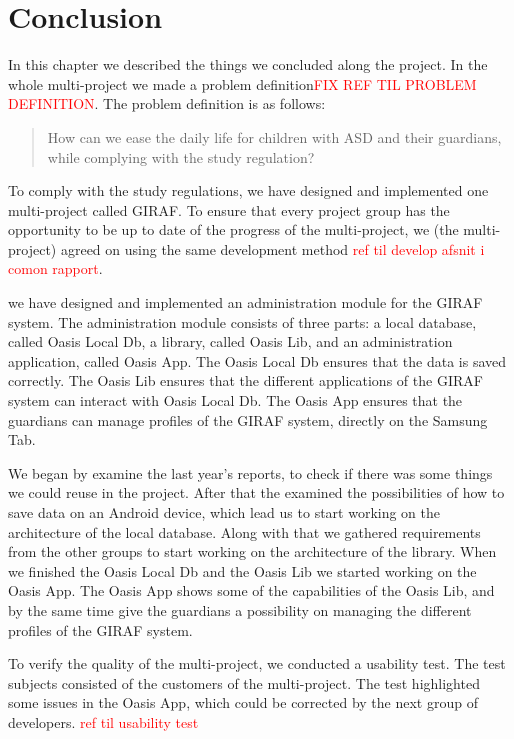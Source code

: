 \section{Conclusion}
In this chapter we described the things we concluded along the project. In the whole multi-project we made a problem definition\textcolor{red}{FIX REF TIL PROBLEM DEFINITION}. The problem definition is as follows:

\begin{quotation}
How can we ease the daily life for children with ASD and their guardians, while complying with the study regulation? 
\end{quotation}

To comply with the study regulations, we have designed and implemented one multi-project called GIRAF. To ensure that every project group has the opportunity to be up to date of the progress of the multi-project, we (the multi-project) agreed on using the same development method \textcolor{red}{ref til develop afsnit i comon rapport}.

we have designed and implemented an administration module for the GIRAF system. The administration module consists of three parts: a local database, called Oasis Local Db, a library, called Oasis Lib, and an administration application, called Oasis App.
The Oasis Local Db ensures that the data is saved correctly. The Oasis Lib ensures that the different applications of the GIRAF system can interact with Oasis Local Db. The Oasis App ensures that the guardians can manage profiles of the GIRAF system, directly on the Samsung Tab.

We began by examine the last year's reports, to check if there was some things we could reuse in the project. After that the examined the possibilities of how to save data on an Android device, which lead us to start working on the architecture of the local database. Along with that we gathered requirements from the other groups to start working on the architecture of the library. When we finished the Oasis Local Db and the Oasis Lib we started working on the Oasis App. The Oasis App shows some of the capabilities of the Oasis Lib, and by the same time give the guardians a possibility on managing the different profiles of the GIRAF system.

To verify the quality of the multi-project, we conducted a usability test. The test subjects consisted of the customers of the multi-project. The test highlighted some issues in the Oasis App, which could be corrected by the next group of developers. \textcolor{red}{ref til usability test}